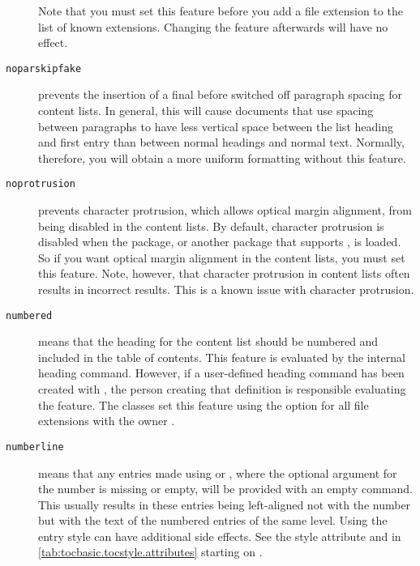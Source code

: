 \begin{description}
  Note that you must set this feature before you add a
  file extension to the list of known extensions. Changing the feature
  afterwards will have no effect.
\item[\texttt{noparskipfake}] prevents
  the insertion of a final  before switched off paragraph
  spacing for content lists. In general, this will cause documents that use
  spacing between paragraphs to have less vertical space between the list
  heading and first entry than between normal headings and normal text.
  Normally, therefore, you will obtain a more uniform formatting without this
  feature.
\item[\texttt{noprotrusion}] prevents
  character protrusion, which allows optical margin alignment, from being
  disabled in the content lists. By default, character protrusion is disabled
  when the  package, or another
  package that supports , is
  loaded. So if you want optical margin alignment in the content lists, you
  must set this feature. Note, however, that character
  protrusion in content lists often results in incorrect results. This is a
  known issue with character protrusion.
\item[\texttt{numbered}] means that the heading for the content list should
  be numbered and included in the table of contents. This feature is evaluated
  by the internal heading command. However, if a user-defined heading command
  has been created with , the person
  creating that definition is responsible evaluating the feature. The
  \KOMAScript{} classes set this feature using the
   option for all file extensions
  with the owner .
\item[\texttt{numberline}] \leavevmode{}%
  means that any entries made using 
  or , where the
  optional argument for the number is missing or empty, will be provided with
  an empty  command. This usually results
  in these entries being left-aligned not with the number but with the text of
  the numbered entries of the same level.
  Using the  entry style
  can have additional side effects. See the style attribute
   and  in
  \autoref{tab:tocbasic.tocstyle.attributes} starting on
  .


\end{description}
